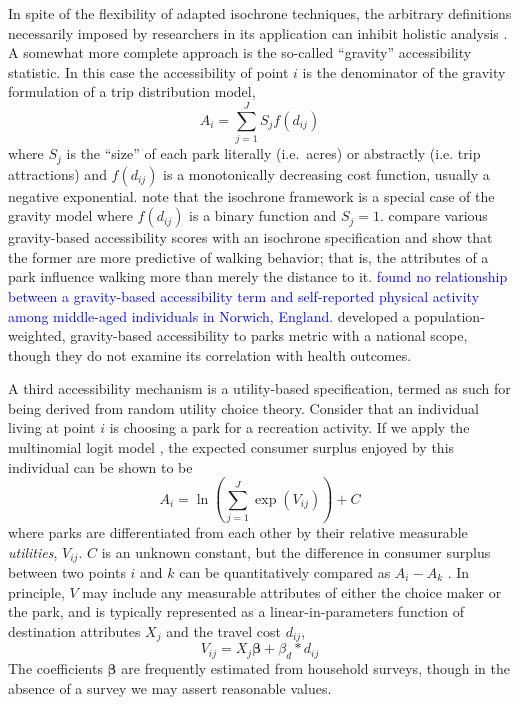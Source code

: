 \documentclass[shortAfour,sageh.bst]{sagej}
\begin{document}
In spite of the flexibility of adapted isochrone techniques, the
arbitrary definitions necessarily imposed by researchers in its
application can inhibit holistic analysis \citep{Logan2017}. A somewhat
more complete approach is the so-called ``gravity'' accessibility
statistic. In this case the accessibility of point \(i\) is the
denominator of the gravity formulation of a trip distribution model,
\begin{equation}\label{eq:gravity}
A_i = \sum_{j = 1}^J S_j f(d_{ij})
\end{equation} where \(S_j\) is the ``size'' of each park literally
(i.e.~acres) or abstractly (i.e. trip attractions) and \(f(d_{ij})\) is
a monotonically decreasing cost function, usually a negative
exponential. \citet{Dong2006} note that the isochrone framework is a
special case of the gravity model where \(f(d_{ij})\) is a binary
function and \(S_j = 1\). \citet{Giles-Corti2005} compare various
gravity-based accessibility scores with an isochrone specification and
show that the former are more predictive of walking behavior; that is,
the attributes of a park influence walking more than merely the distance
to it. \textcolor{blue}{\citet{hillsdon2006relationship} found no relationship between a
gravity-based accessibility term and self-reported physical activity
among middle-aged individuals in Norwich, England.} \citet{Zhang2011}
developed a population-weighted, gravity-based accessibility to parks
metric with a national scope, though they do not examine its correlation
with health outcomes.

A third accessibility mechanism is a utility-based specification, termed
as such for being derived from random utility choice theory. Consider
that an individual living at point \(i\) is choosing a park for a
recreation activity. If we apply the multinomial logit model
\citep{McFadden1974}, the expected consumer surplus enjoyed by this
individual can be shown to be \begin{equation}\label{eq:utility}
A_i = \ln\left({\sum_{j = 1}^J\exp(V_{ij})}\right) + C
\end{equation} where parks are differentiated from each other by their
relative measurable \emph{utilities}, \(V_{ij}\). \(C\) is an unknown
constant, but the difference in consumer surplus between two points
\(i\) and \(k\) can be quantitatively compared as \(A_i - A_k\)
\citep{Bruce1977}. In principle, \(V\) may include any measurable
attributes of either the choice maker or the park, and is typically
represented as a linear-in-parameters function of destination attributes
\(X_j\) and the travel cost \(d_{ij}\),
\begin{equation}\label{eq:utilityV}
V_{ij} = X_j\boldsymbol{\beta} + \beta_d * d_{ij}
\end{equation} The coefficients \(\boldsymbol{\beta}\) are frequently
estimated from household surveys, though in the absence of a survey we
may assert reasonable values.
\end{document}
